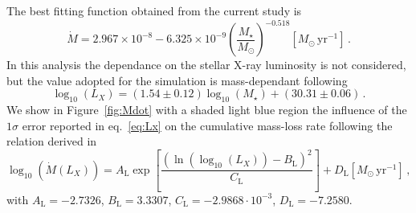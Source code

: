 \documentclass{aa}
\begin{document}
The best fitting function obtained from the current study is
\begin{equation}
  \dot{M} = 2.967\times10^{-8} - 6.325\times10^{-9} \left(\frac{M_\star}{M_\odot}\right)^{-0.518} [M_\odot\, \mathrm{yr}^{-1}]\,.
\end{equation}
In this analysis the dependance on the stellar X-ray luminosity is not considered, but the value 
adopted for the simulation is mass-dependant following 
\begin{equation}\label{eq:Lx}
	\log_{10}{(L_X)} = (1.54 \pm 0.12) \log_{10}{(M_\star)} + (30.31 \pm 0.06)\,.
\end{equation}
We show in Figure~\ref{fig:Mdot} with a shaded light blue region the influence of the $1 \sigma$ error reported in eq.~\ref{eq:Lx} on the cumulative mass-loss rate following the relation derived in 
\begin{equation}\label{eq:MdotLx}
  \log_{10}(\dot{M}(L_X)) = A_\textrm{L} \exp{\left[\frac{(\ln{(\log_{10}(L_X))}-B_\textrm{L})^2}{C_\textrm{L}}\right]} + D_\textrm{L} [M_\odot\, \mathrm{yr}^{-1}]\,,
\end{equation}
with $A_\textrm{L} = -2.7326$, $B_\textrm{L} = 3.3307$, $C_\textrm{L} = -2.9868\cdot10^{-3}$, $D_\textrm{L} = -7.2580$.
\end{document}
